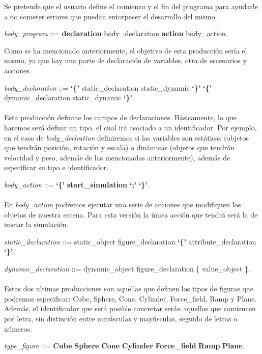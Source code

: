 \documentclass[12pt]{article}
\begin{document}
Se pretende que el usuario define el comienzo y el fin del programa para ayudarle a no cometer errores que puedan entorpecer el desarrollo del mismo.

\noindent \textit{body\_program} ::= \textbf{declaration} body\_declaration \textbf{action} body\_action.

Como se ha mencionado anteriormente, el objetivo de esta producción sería el mismo, ya que hay una parte de declaración de variables, otra de escenarios y acciones.

\noindent \textit{body\_declaration} ::= \textbf{`\{'} static\_declaration static\_dynamic \textbf{`\}'} \textbar\space \textbf{`\{'} dynamic\_declaration static\_dynamic \textbf{`\}'}.  \\ \\
Esta producción definine los campos de declaraciones. Básicamente, lo que haremos será definir un tipo, el cual irá asociado a un identificador. Por ejemplo, en el caso de \textit{body\_declration} definiremos si las variables son estáticas (objetos que tendrán posición, rotación y escala) o dinámicas (objetos que tendrán velocidad y peso, además de las mencionadas anteriormente), además de especificar su tipo e identificador.

\noindent \textit{body\_action} ::= \textbf{`\{'} \textbf{start\_simulation} \textbf{`;'} \textbf{`\}'}. \\ \\
En \textit{body\_action} podremos ejecutar una serie de acciones que modifiquen los objetos de nuestra escena. Para esta versión la única acción que tendrá será la de iniciar la simulación.

\noindent \textit{static\_declaration} ::= static\_object figure\_declaration \textbf{`\{'} attribute\_declaration \textbf{`\}'}.

\noindent \textit{dynamic\_declaration} ::= dynamic\_object figure\_declaration \{ value\_object \}. \\ \\
Estas dos ultimas producciones son aquellas que definen los tipos de figuras que podremos especificar: Cube, Sphere, Cone, Cylinder, Force\_field, Ramp y Plane. Además, el identificador que será posible concretar serán aquellos que comiencen por letra, sin distinción entre minúsculas y mayúsculas, seguido de letras o números.

\noindent \textit{type\_figure} ::= \textbf{Cube} \textbar\space \textbf{Sphere} \textbar\space \textbf{Cone} \textbar\space \textbf{Cylinder} \textbar\space \textbf{Force\_field} \textbar\space \textbf{Ramp} \textbar\space  \textbf{Plane}.
\end{document}
